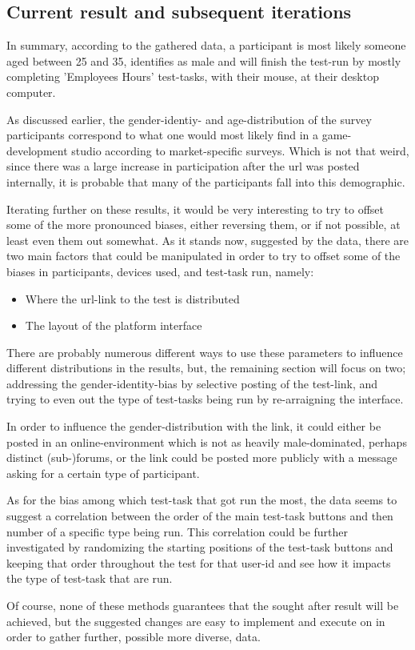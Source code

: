   \subsection{Current result and subsequent iterations}

  In summary, according to the gathered data, a participant is most likely
  someone aged between 25 and 35, identifies as male and will finish the
  test-run by mostly completing 'Employees Hours' test-tasks, with their mouse,
  at their desktop computer.

  As discussed earlier, the gender-identiy- and age-distribution of the
  survey participants correspond to what one would most likely find in a
  game-development studio according to market-specific
  surveys\cite{citeIndex2019}. Which is not that weird, since there was a large
  increase in participation after the url was posted internally, it is probable
  that many of the participants fall into this demographic.

  Iterating further on these results, it would be
  very interesting to try to offset some of the more pronounced biases, either
  reversing them, or if not possible, at least even them out somewhat.
  As it stands now, suggested by the data, there are two main factors that
  could be manipulated in order to try to offset some of the biases in
  participants, devices used, and test-task run, namely:

  \begin{itemize}
    \item{Where the url-link to the test is distributed}
    \item{The layout of the platform interface}
  \end{itemize}

  There are probably numerous different ways to use these parameters to
  influence different distributions in the results, but, the remaining section
  will focus on two; addressing the gender-identity-bias by selective posting
  of the test-link, and trying to even out the type of test-tasks being run by
  re-arraigning the interface.

  In order to influence the gender-distribution with the link, it could
  either be posted in an online-environment which is not as heavily
  male-dominated, perhaps distinct (sub-)forums, or the link could be posted
  more publicly with a message asking for a certain type of participant.

  As for the bias among which test-task that got run the most, the data seems
  to suggest a correlation between the order of the main test-task buttons and
  then number of a specific type being run. This correlation could be further
  investigated by randomizing the starting positions of the test-task buttons
  and keeping that order throughout the test for that user-id and see how it
  impacts the type of test-task that are run.

  Of course, none of these methods guarantees that the sought after result will
  be achieved, but the suggested changes are easy to implement and execute on
  in order to gather further, possible more diverse, data.


